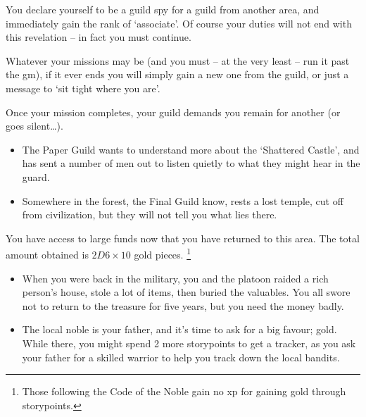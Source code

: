 \begin{multicols}{2}
You declare yourself to be a guild spy for a guild from another area, and immediately gain the rank of `associate'.%
Of course your  duties will not end with this revelation -- in fact you must continue.

Whatever your missions may be (and you must -- at the very least -- run it past the \gls{gm}), if it ever ends you will simply gain a new one from the guild, or just a message to `sit tight where you are'.

Once your mission completes, your guild demands you remain for another (or goes silent\ldots).

\begin{itemize}

  \item
  The Paper Guild wants to understand more about the `Shattered Castle', and has sent a number of men out to listen quietly to what they might hear in the guard.
  \item
  Somewhere in the forest, the Final Guild know, rests a lost temple, cut off from civilization, but they will not tell you what lies there.

\end{itemize}

You have access to large funds now that you have returned to this area.
The total amount obtained is $2D6 \times 10$ gold pieces.%
\footnote{Those following the Code of the Noble gain no \gls{xp} for gaining gold through \glspl{storypoint}.}

\begin{itemize}
  \item
  When you were back in the military, you and the platoon raided a rich person's house, stole a lot of items, then buried the valuables.
  You all swore not to return to the treasure for five years, but you need the money badly.
  \item
  The local noble is your father, and it's time to ask for a big favour; gold.
  While there, you might spend 2 more \glspl{storypoint} to get a tracker, as you ask your father for a skilled warrior to help you track down the local bandits.
\end{itemize}

\end{multicols}
